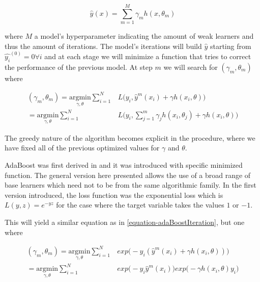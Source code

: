 \documentclass{article}%
\theoremstyle{definition}
\begin{document}
\begin{equation} \label{equation-adaBoostModel}
\hat{y}(x) = \sum_{m=1}^{M} \gamma_m h(x,\theta_m)
\end{equation}

where $M$ a model's hyperparameter indicating the amount of weak learners and thus the amount of iterations. The model's iterations will build $\hat{y}$ starting from $\hat{y_i}^{(0)}= 0 \forall i$ and at each stage we will minimize a function that tries to correct the performance of the previous model. At step $m$ we will search for $(\gamma_{m}, \theta_{m})$ where

\begin{equation} \label{equation-adaBoostIteration}
\begin{split}
(\gamma_{m}, \theta_{m}) = \underset{\gamma, \theta}{\mathrm{argmin}}  \sum_{i=1}^{N} & L\big( y_i,   \hat{y}^{m}(x_i) + \gamma h(x_i,\theta) \big) \\
= \underset{\gamma, \theta}{\mathrm{argmin}} \sum_{i=1}^{N}  & L\big( y_i,    \sum_{j=1}^{m} \gamma_j h(x_i,\theta_j) + \gamma h(x_i,\theta) \big) 
 \end{split}
\end{equation}

The greedy nature of the algorithm becomes explicit in the procedure, where we have fixed all of the previous optimized values for $\gamma$ and $\theta$. 

AdaBoost was first derived in \cite{schapire-adaBoost} and it was introduced with specific  minimized function. The general version here presented allows the use of a broad range of base learners which need not to be from the same algorithmic family. In the first version introduced, the loss function was the exponential loss which is $L(y,z) = e^{-yz}$ for the case where the target variable takes the values $1$ or $-1$.

This will yield a similar equation as in \ref{equation-adaBoostIteration}, but one where

\begin{equation} \label{equation-adaBoostExponentialIteration}
\begin{split}
(\gamma_{m}, \theta_{m}) = \underset{\gamma, \theta}{\mathrm{argmin}}  \sum_{i=1}^{N} & exp\big( -y_i  (\hat{y}^{m}(x_i) + \gamma h(x_i,\theta) )\big) \\
= \underset{\gamma, \theta}{\mathrm{argmin}}  \sum_{i=1}^{N} & exp\big( -y_i  \hat{y}^{m}(x_i)\big) exp\big(- \gamma h(x_i,\theta)y_i \big) 
\end{split}
\end{equation}
\end{document}
